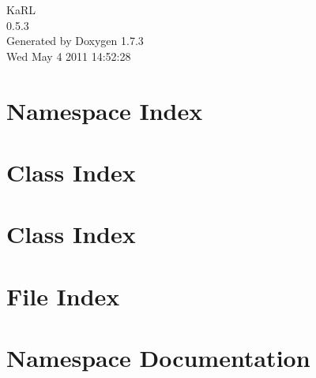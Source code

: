 \documentclass[a4paper]{book}
\begin{document}
\hypersetup{pageanchor=false}
\begin{titlepage}
\vspace*{7cm}
\begin{center}
{\Large KaRL \\[1ex]\large 0.5.3 }\\
\vspace*{1cm}
{\large Generated by Doxygen 1.7.3}\\
\vspace*{0.5cm}
{\small Wed May 4 2011 14:52:28}\\
\end{center}
\end{titlepage}
\clearemptydoublepage
{}
\tableofcontents
\clearemptydoublepage
{}
\hypersetup{pageanchor=true}
\chapter{Namespace Index}

\chapter{Class Index}

\chapter{Class Index}

\chapter{File Index}

\chapter{Namespace Documentation}






\end{document}

